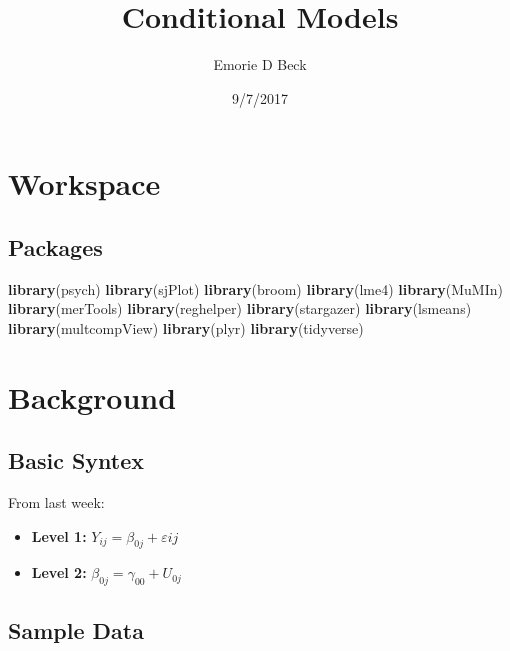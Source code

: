 \documentclass[]{article}
\title{Conditional Models}
\author{Emorie D Beck}
\date{9/7/2017}
\newenvironment{Shaded}{\begin{snugshade}}{\end{snugshade}}
\newcommand{\KeywordTok}[1]{\textcolor[rgb]{0.13,0.29,0.53}{\textbf{{#1}}}}
\newcommand{\NormalTok}[1]{{#1}}
\begin{document}
\maketitle

\section{Workspace}\label{workspace}

\subsection{Packages}\label{packages}

\begin{Shaded}
\begin{Highlighting}[]
\KeywordTok{library}\NormalTok{(psych)}
\KeywordTok{library}\NormalTok{(sjPlot)}
\KeywordTok{library}\NormalTok{(broom)}
\KeywordTok{library}\NormalTok{(lme4)}
\KeywordTok{library}\NormalTok{(MuMIn)}
\KeywordTok{library}\NormalTok{(merTools)}
\KeywordTok{library}\NormalTok{(reghelper)}
\KeywordTok{library}\NormalTok{(stargazer)}
\KeywordTok{library}\NormalTok{(lsmeans)}
\KeywordTok{library}\NormalTok{(multcompView)}
\KeywordTok{library}\NormalTok{(plyr)}
\KeywordTok{library}\NormalTok{(tidyverse)}
\end{Highlighting}
\end{Shaded}

\section{Background}\label{background}

\subsection{Basic Syntex}\label{basic-syntex}

From last week:

\begin{itemize}
  \item \textbf{Level 1:} $Y_{ij} = \beta_{0j} + \varepsilon{ij}$
  \item \textbf{Level 2:} $\beta_{0j} = \gamma_{00} + U_{0j}$
\end{itemize}

\subsection{Sample Data}\label{sample-data}
\end{document}
